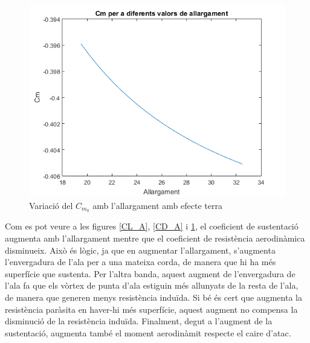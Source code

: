 \begin{figure}[H]
	\centering
	\includegraphics[scale=0.5]{./plots/Cm_A}
	\caption{Variació del $C_{m_{0}}$ amb l'allargament amb efecte terra}
	\label{Cm_A}
\end{figure}

Com es pot veure a les figures \ref{CL_A}, \ref{CD_A} i \ref{Cm_A}, el coeficient de sustentació augmenta amb l'allargament mentre que el coeficient de resistència aerodinàmica disminueix. Això és lògic, ja que en augmentar l'allargament, s'augmenta l'envergadura de l'ala per a una mateixa corda, de manera que hi ha més superfície que sustenta. Per l'altra banda, aquest augment de l'envergadura de l'ala fa que els vòrtex de punta d'ala estiguin més allunyats de la resta de l'ala, de manera que generen menys resistència induïda. Si bé és cert que augmenta la resistència paràsita en haver-hi més superfície, aquest augment no compensa la disminució de la resistència induïda. Finalment, degut a l'augment de la sustentació, augmenta també el moment aerodinàmit respecte el caire d'atac.